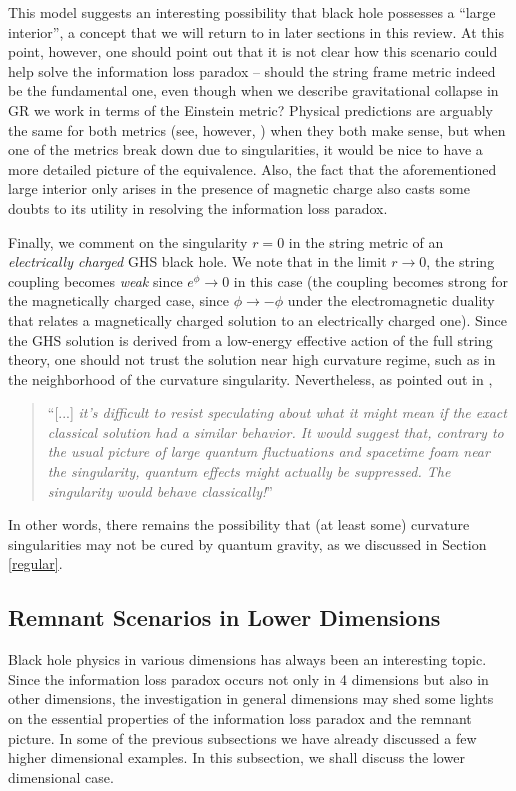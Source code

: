\documentclass[12pt]{article}
\newcommand{\2}{$^2$}
\newcommand{\3}{$^3$}
\newcommand{\4}{$_4$}
\newcommand{\5}{$_5$}
\begin{document}
This model suggests an interesting possibility that black hole possesses a ``large interior'', a concept that we will return to in later sections in this review. At this point, however, one should point out that it is not clear how this scenario could help solve the information loss paradox -- should the string frame metric indeed be the fundamental one, even though when we describe gravitational collapse in GR we work in terms of the Einstein metric? Physical predictions are arguably the same for both metrics \cite{0111031} (see, however, \cite{9806032}) when they both make sense, but when one of the metrics break down due to singularities, it would be nice to have a more detailed picture of the equivalence. 
Also, the fact that the aforementioned large interior only arises in the presence of magnetic charge also casts some doubts to its utility in resolving the information loss paradox.

Finally, we comment on the singularity $r=0$ in the string metric of an \emph{electrically charged} GHS black hole. We note that in the limit $r \to 0$, the string coupling becomes \emph{weak} since $e^\phi \to 0$ in this case (the coupling becomes strong for the magnetically charged case, since $\phi \to -\phi$ under the electromagnetic duality that relates a magnetically charged solution to an electrically charged one). Since the GHS solution is derived from a low-energy effective action of the full string theory, one should not trust the solution near high curvature regime, such as in the neighborhood of the curvature singularity. Nevertheless, as pointed out in \cite{dark},
\begin{quote}
``[...] \emph{it's difficult to resist speculating about what it might mean if the exact classical solution had
a similar behavior. It would suggest that, contrary to the usual picture of large quantum
fluctuations and spacetime foam near the singularity, quantum effects might actually be
suppressed. The singularity would behave classically!}''
\end{quote}
In other words, there remains the possibility that (at least some) curvature singularities may not be cured by quantum gravity, as we discussed in Section \ref{regular}.

\subsection{Remnant Scenarios in Lower Dimensions}

Black hole physics in various dimensions has always been an interesting topic. Since the information loss paradox occurs not only in 4 dimensions but also in other dimensions, the investigation in general dimensions may shed some lights on the essential properties of the information loss paradox and the remnant picture. In some of the previous subsections we have already discussed a few higher dimensional examples. In this subsection, we shall discuss the lower dimensional case.
\end{document}
